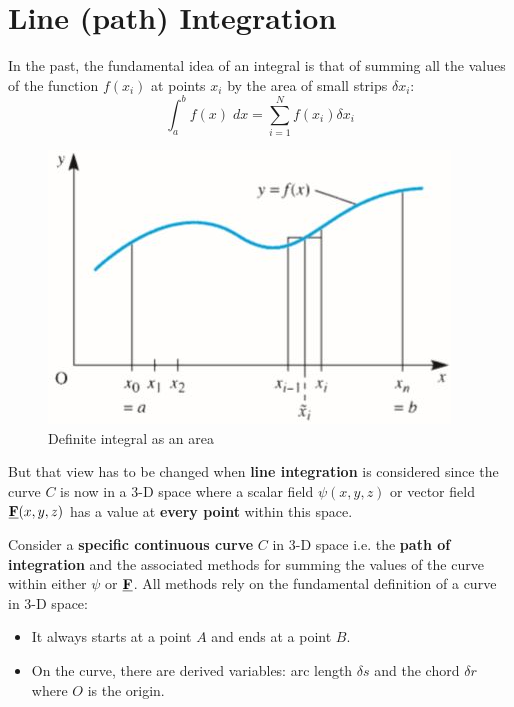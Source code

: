 \documentclass[10pt,a4paper]{article}
\begin{document}
\section{Line (path) Integration}

In the past, the fundamental idea of an integral is that of summing all the values of the function
$f(x_i)$ at points $x_i$ by the area of small strips $\delta x_i$:
$$
    \int_a^b f(x)\; dx = \sum_{i=1}^N f(x_i)\delta x_i
$$
\begin{figure} [h!]
    \centering
    \includegraphics[scale=0.6]{Integral.JPG}
    \caption{Definite integral as an area}
\end{figure}

But that view has to be changed when \textbf{line integration} is considered since the curve $C$ is
now in a 3-D space where a scalar field $\psi(x,y,z)$ or vector field
$\textbf{\underline{F}}(x,y,z)$ has a value at \textbf{every point} within this space. 

Consider a \textbf{specific continuous curve} $C$ in 3-D space i.e. the \textbf{path of
integration} and the associated methods for summing the values of the curve within either $\psi$ or
$\textbf{\underline{F}}$. All methods rely on the fundamental definition of a curve in 3-D space: 
\begin{itemize}
    \item It always starts at a point $A$ and ends at a point $B$.
    \item On the curve, there are derived variables: arc length $\delta s$ and the chord $\delta r$
    where $O$ is the origin.
\end{itemize}
\end{document}
